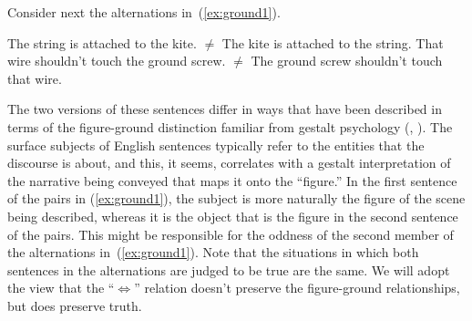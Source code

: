 \documentclass[twoside, 12pt]{article}
\begin{document}
Consider next the alternations in~(\ref{ex:ground1}).
\begin{exe}
\raggedright
  \ex \label{ex:ground1}
  \begin{xlist}
    \ex The string is attached to the kite. $\neq$ The kite is attached to the string.
    \ex That wire shouldn't touch the ground screw. $\neq$ The ground screw shouldn't touch that wire.
  \end{xlist}
\end{exe}
The two versions of these sentences differ in ways that have been described in terms of the figure-ground distinction familiar from gestalt psychology (\citealt{Kofka:1955}, \citealt{Talmy:1975}). The surface subjects of English sentences typically refer to the entities that the discourse is about, and this, it seems, correlates with a gestalt interpretation of the narrative being conveyed that maps it onto the ``figure.'' In the first sentence of the pairs in (\ref{ex:ground1}), the subject is more naturally the figure of the scene being described, whereas it is the object that is the figure in the second sentence of the pairs. This might be responsible for the oddness of the second member of the alternations in~(\ref{ex:ground1}). Note that the situations in which both sentences in the alternations are judged to be true are the same. We will adopt the view that the ``$\Leftrightarrow$'' relation doesn't preserve the figure-ground relationships, but does preserve truth.
\end{document}
